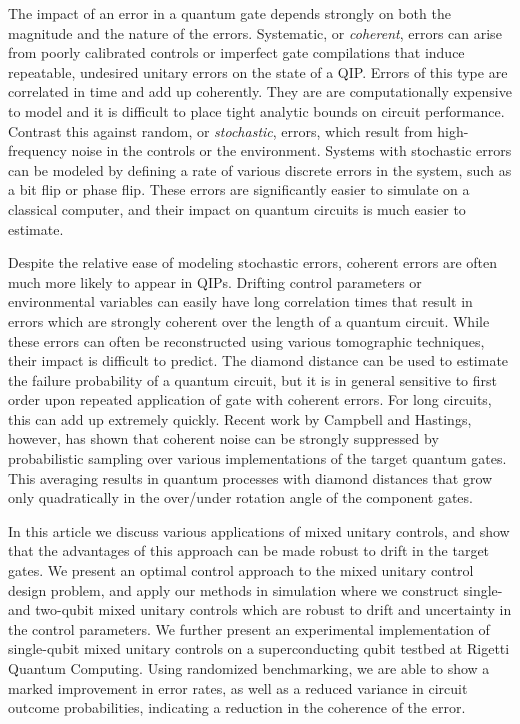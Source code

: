 \documentclass[aps,nofootinbib,pra,notitlepage,twocolumn]{revtex4-1}
\begin{document}
The impact of an error in a quantum gate depends strongly on both the magnitude and the nature of the errors. Systematic, or \emph{coherent}, errors can arise from poorly calibrated controls or imperfect gate compilations that induce repeatable, undesired unitary errors on the state of a QIP. Errors of this type are correlated in time and add up coherently. They are are  computationally expensive to model and it is difficult to place tight analytic bounds on circuit performance. Contrast this against random, or \emph{stochastic}, errors, which result from high-frequency noise in the controls or the environment. Systems with stochastic errors can be  modeled by defining a rate of various discrete errors in the system, such as a bit flip or phase flip. These errors are significantly easier to simulate on a classical computer, and their impact on quantum circuits is much easier to estimate.

Despite the relative ease of modeling stochastic errors, coherent errors are often much more likely to appear in QIPs. Drifting control parameters or environmental variables can easily have long correlation times that result in errors which are strongly coherent over the length of a quantum circuit. While these errors can often be reconstructed using various tomographic techniques, their impact is difficult to predict. The diamond distance can be used to estimate the failure probability of a quantum circuit, but it is in general sensitive to first order upon repeated application of gate with coherent errors. For long circuits, this can add up extremely quickly. Recent work by Campbell and Hastings\cite{Campbell2017, 1612.01011, 1811.08017}, however, has shown that coherent noise can be strongly suppressed by probabilistic sampling over various implementations of the target quantum gates. This averaging results in quantum processes with diamond distances that grow only quadratically in the over/under rotation angle of the component gates.

In this article we discuss various applications of mixed unitary controls, and show that the advantages of this approach can be made robust to drift in the target gates. We present an optimal control approach to the mixed unitary control design problem, and apply our methods in simulation where we construct single- and two-qubit mixed unitary controls which are robust to drift and uncertainty in the control parameters. We further present an experimental implementation of single-qubit mixed unitary controls on a superconducting qubit testbed at Rigetti Quantum Computing. Using randomized benchmarking, we are able to show a marked improvement in error rates, as well as a reduced variance in circuit outcome probabilities, indicating a reduction in the coherence of the error.
\end{document}
